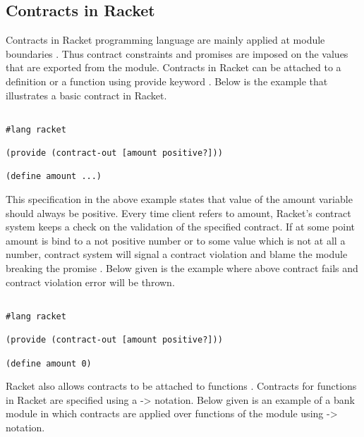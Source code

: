 \subsection{Contracts in Racket}

Contracts in Racket programming language are mainly applied at module boundaries \cite{RacketContracts}. Thus contract constraints and promises are imposed on the values that are exported from the module. Contracts in Racket can be attached to a definition or a function using provide keyword \cite{RacketContracts}.
Below is the example that illustrates a basic contract in Racket.

\begin{minipage}{\linewidth}
\lstset{caption=Basic contract example in Racket, captionpos=b, breaklines=true}       
\begin{lstlisting}[frame=single]

#lang racket

(provide (contract-out [amount positive?]))
 
(define amount ...)

\end{lstlisting}
\end{minipage}

This specification in the above example states that value of the amount variable should always be positive. Every time client refers to amount, Racket's contract system keeps a check on the validation of the specified contract. If at some point amount is bind to a not positive number or to some value which is not at all a number, contract system will signal a contract violation and blame the module breaking the promise \cite{RacketContracts}. Below given is the example where above contract fails and contract violation error will be thrown. \linebreak


\begin{minipage}{\linewidth}
\lstset{caption=Contract violation example in Racket, captionpos=b, breaklines=true}       
\begin{lstlisting}[frame=single]

#lang racket

(provide (contract-out [amount positive?]))
 
(define amount 0)

\end{lstlisting}
\end{minipage}

Racket also allows contracts to be attached to functions \cite{RacketContractsFunc}. Contracts for functions in Racket are specified using a -> notation. Below given is an example of a bank module in which contracts are applied over functions of the module using -> notation.

